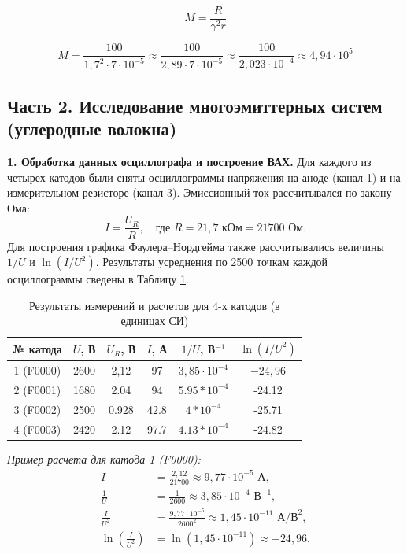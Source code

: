 \documentclass[a4paper]{article}
\begin{document}

\[
M = \frac{R}{\gamma^2 r}
\]

\[
M = \frac{100}{1{,}7^2 \cdot 7 \cdot 10^{-5}} \approx \frac{100}{2{,}89 \cdot 7 \cdot 10^{-5}} \approx \frac{100}{2{,}023 \cdot 10^{-4}} \approx 4{,}94 \cdot 10^5
\]


\subsection*{Часть 2. Исследование многоэмиттерных систем (углеродные волокна)}

\textbf{1. Обработка данных осциллографа и построение ВАХ.}
Для каждого из четырех катодов были сняты осциллограммы напряжения на аноде (канал 1) и на измерительном резисторе (канал 3). Эмиссионный ток рассчитывался по закону Ома:
\[
I = \frac{U_R}{R}, \quad \text{где } R = 21{,}7 \text{ кОм} = 21700 \text{ Ом}.
\]
Для построения графика Фаулера--Нордгейма также рассчитывались величины $1/U$ и $\ln(I/U^2)$. Результаты усреднения по 2500 точкам каждой осциллограммы сведены в Таблицу \ref{tab:vxh_cathodes}.

\begin{table}[!htbp]
    \centering
    \caption{Результаты измерений и расчетов для 4-х катодов (в единицах СИ)}
    \label{tab:vxh_cathodes}
    \begin{tabular}{|c|c|c|c|c|c|}
    \hline
    № катода & $U$, В & $U_R$, В & $I$, А & $1/U$, В$^{-1}$ & $\ln(I/U^2)$ \\
    \hline
    1 (F0000) & 2600 & 2,12 & 97 & $3{,}85 \cdot 10^{-4}$ & $-24{,}96$ \\
    2 (F0001) & 1680 & 2.04 & 94 & $5.95*10^{-4}$ & -24.12 \\
    3 (F0002) & 2500 & 0.928 & 42.8 & $4*10^{-4}$ & -25.71 \\
    4 (F0003) & 2420 & 2.12 & 97.7 & $4.13*10^{-4}$ & -24.82 \\
    \hline
    \end{tabular}
\end{table}

\textit{Пример расчета для катода 1 (F0000):}
\begin{align*}
    I &= \frac{2{,}12}{21700} \approx 9{,}77 \cdot 10^{-5} \text{ А}, \\
    \frac{1}{U} &= \frac{1}{2600} \approx 3{,}85 \cdot 10^{-4} \text{ В}^{-1}, \\
    \frac{I}{U^2} &= \frac{9{,}77 \cdot 10^{-5}}{2600^2} \approx 1{,}45 \cdot 10^{-11} \text{ А/В}^2, \\
    \ln\left(\frac{I}{U^2}\right) &= \ln(1{,}45 \cdot 10^{-11}) \approx -24{,}96.
\end{align*}
\end{document}
